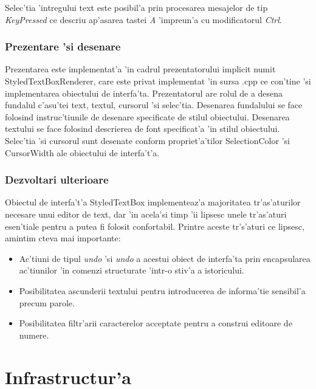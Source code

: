 \medskip

Selec'tia 'intregului text este posibil'a prin procesarea mesajelor de tip \emph{KeyPressed} ce descriu ap'asarea tastei \emph{A} 'impreun'a cu modificatorul \emph{Ctrl}.

\subsubsection{Prezentare 'si desenare}

Prezentarea este implementat'a 'in cadrul prezentatorului implicit numit StyledTextBoxRenderer, care este privat implementat 'in sursa .cpp ce con'tine 'si implementarea obiectului de interfa'ta. Prezentatorul are rolul de a desena fundalul c'asu'tei text, textul, cursorul 'si selec'tia. Desenarea fundalului se face folosind instruc'tiunile de desenare specificate de stilul obiectului. Desenarea textului se face folosind descrierea de font specificat'a 'in stilul obiectului. Selec'tia 'si cursorul sunt desenate conform propriet'a'tilor SelectionColor 'si CursorWidth ale obiectului de interfa't'a.

\subsubsection{Dezvoltari ulterioare}

Obiectul de interfa't'a StyledTextBox implementeaz'a majoritatea tr'as'aturilor necesare unui editor de text, dar 'in acela'si timp 'ii lipsesc unele tr'as'aturi esen'tiale pentru a putea fi folosit confortabil. Printre aceste tr's'aturi ce lipsesc, amintim c{\ia}teva mai importante:

\begin{itemize}
\item Ac'tiuni de tipul \emph{undo} 'si \emph{undo} a acestui obiect de interfa'ta prin encapsularea ac'tiunilor 'in comenzi structurate 'intr-o stiv'a a istoricului.
\item Posibilitatea ascunderii textului pentru introducerea de informa'tie sensibil'a precum parole.
\item Posibilitatea filtr'arii caracterelor acceptate pentru a construi editoare de numere.
\end{itemize}


\section{Infrastructur'a}

